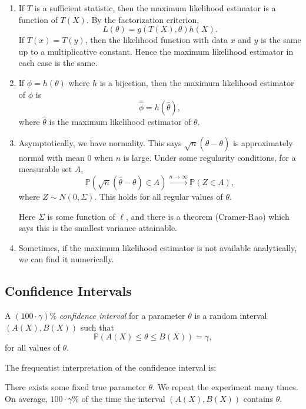 \documentclass[12pt]{article}
\begin{document}
\begin{enumerate}[1.]
	\item If $T$ is a sufficient statistic, then the maximum likelihood estimator is a function of $T(X)$. By the factorization criterion,
		\[
		L(\theta) = g(T(X), \theta) h(X)
		.\]
		If $T(x) = T(y)$, then the likelihood function with data $x$ and $y$ is the same up to a multiplicative constant. Hence the maximum likelihood estimator in each case is the same.
	\item If  $\phi = h(\theta)$ where $h$ is a bijection, then the maximum likelihood estimator of $\phi$ is
		\[
		\hat \phi = h(\hat \theta)
		,\]
		where $\hat \theta$ is the maximum likelihood estimator of $\theta$.
	\item Asymptotically, we have normality. This says $\sqrt n (\hat \theta - \theta)$ is approximately normal with mean $0$ when $n$ is large. Under some regularity conditions, for a measurable set $A$,
		\[
			\mathbb{P}(\sqrt n (\hat \theta - \theta) \in A) \overset{n \to \infty}{\to} \mathbb{P}(Z \in A)
		,\]
		where $Z \sim N(0, \Sigma)$. This holds for all regular values of $\theta$.

		Here $\Sigma$ is some function of $\ell$, and there is a theorem (Cramer-Rao) which says this is the smallest variance attainable.
	\item Sometimes, if the maximum likelihood estimator is not available analytically, we can find it numerically.
\end{enumerate}

\subsection{Confidence Intervals}
\label{sub:confidence_intervals}

\begin{definition}
	A $(100 \cdot \gamma)$\% \emph{confidence interval} for a parameter $\theta$ is a random interval $(A(X), B(X))$ such that
	\[
	\mathbb{P}(A(X) \leq \theta \leq B(X)) = \gamma
	,\]
	for all values of $\theta$.
\end{definition}

The frequentist interpretation of the confidence interval is:
\begin{center}
	There exists some fixed true parameter $\theta$. We repeat the experiment many times. On average, $100 \cdot \gamma$\% of the time the interval $(A(X), B(X))$ contains $\theta$.
\end{center}
\end{document}
